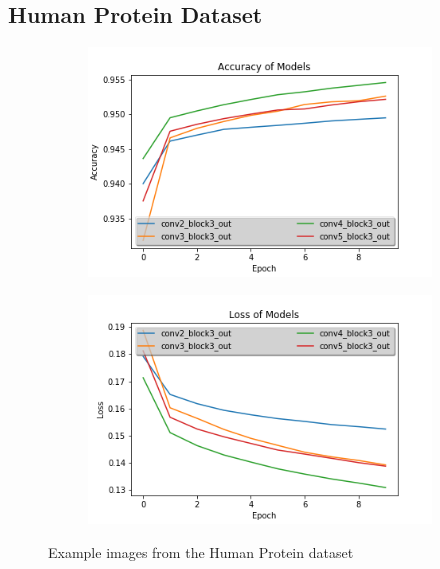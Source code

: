 \documentclass{article}
\begin{document}
\subsection{Human Protein Dataset}
\begin{figure}[ht]
    \centering
    \begin{subfigure}[b]{0.8\linewidth}
      \includegraphics[width=\linewidth]{paper/figures/accuray.png}
    \end{subfigure}
    
    \begin{subfigure}[b]{0.8\linewidth}
      \includegraphics[width=\linewidth]{paper/figures/loss.png}
    \end{subfigure}
    \caption{Example images from the Human Protein dataset}
  \end{figure}
\end{document}
